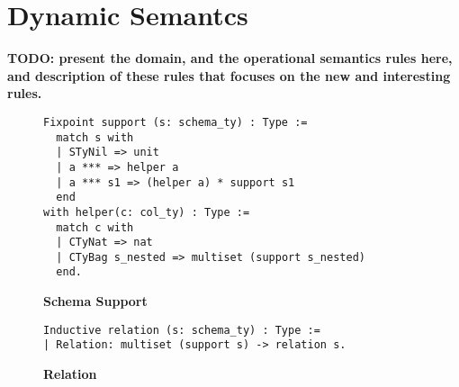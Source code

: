 \section{Dynamic Semantcs}
\label{sec:semantics}

{\bf TODO: present the domain, and the operational semantics rules here, 
and description of these rules that focuses on the new and interesting rules.}

\begin{figure}
\begin{center}
\begin{lstlisting}[language={}]
Fixpoint support (s: schema_ty) : Type :=
  match s with
  | STyNil => unit
  | a *** => helper a
  | a *** s1 => (helper a) * support s1
  end
with helper(c: col_ty) : Type :=
  match c with
  | CTyNat => nat
  | CTyBag s_nested => multiset (support s_nested)
  end.
\end{lstlisting}
\end{center}
\caption{\textbf{Schema Support}}
\label{fig-schema_support}
\end{figure}

\begin{figure}
\begin{center}
\begin{lstlisting}
Inductive relation (s: schema_ty) : Type := 
| Relation: multiset (support s) -> relation s.
\end{lstlisting}
\end{center}
\caption{\textbf{Relation}}
\label{fig-relation}
\end{figure}

